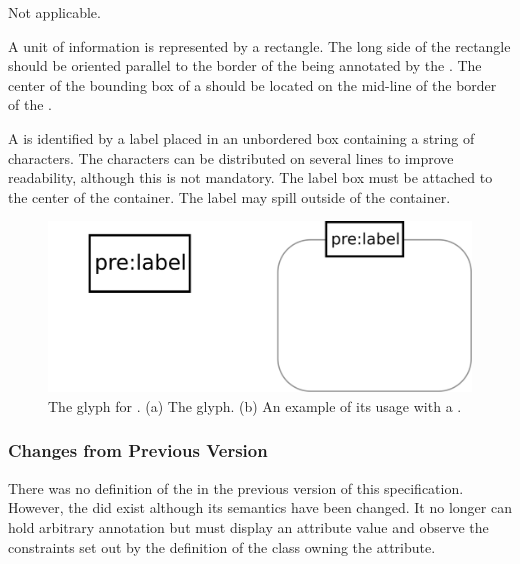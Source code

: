 \begin{glyphDescription}

\glyphSboTerm Not applicable.

\glyphContainer A unit of information is represented by a rectangle.  The long side of the rectangle should be oriented parallel to the border of the  being annotated by the . The center of the bounding box of a  should be located on the mid-line of the border of the .

\glyphLabel A  is identified by a label placed in an unbordered box containing a string of characters.  The characters can be distributed on several lines to improve readability, although this is not mandatory.  The label box must be attached to the center of the container.  The label may spill outside of the container.


\end{glyphDescription}

\begin{figure}[htb]
  \centering
  \includegraphics[scale = 0.3]{images/unitInformation}
  \caption{The \PD glyph for . (a) The
    glyph. (b) An example of its usage with a .}
  \label{fig:techref:unitInfo}
\end{figure}


\subsubsection{Changes from Previous Version}

There was no definition of the  in the
previous version of this specification. However, the  did exist although its semantics have been changed. It
no longer can hold arbitrary annotation but must display an attribute
value and observe the constraints set out by the definition of the
class owning the attribute.

